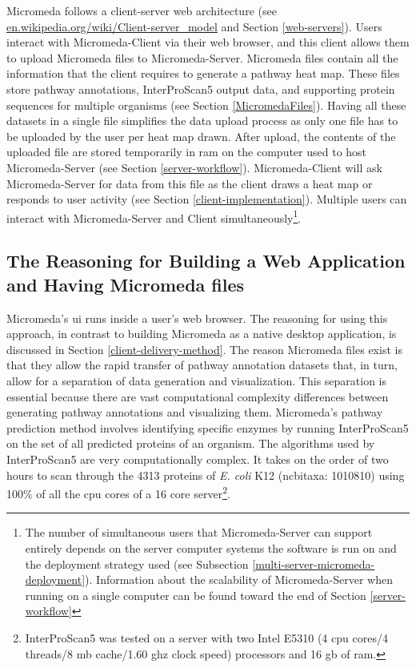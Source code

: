 Micromeda follows a client-server web architecture \cite{svobodova1985client} 
(see 
\href{http://en.wikipedia.org/wiki/Client-server_model}{en.wikipedia.org/wiki/Client-server\_model} 
and Section \ref{web-servers}). Users interact with Micromeda-Client via their 
web browser, and this client allows them to upload Micromeda files to 
Micromeda-Server. Micromeda files contain all the information that the client 
requires to generate a pathway heat map. These files store pathway annotations, 
InterProScan5 output data, and supporting protein sequences for multiple 
organisms (see Section \ref{MicromedaFiles}). Having all these datasets in a 
single file simplifies the data upload process as only one file has to be 
uploaded by the user per heat map drawn. After upload, the contents of the 
uploaded file are stored temporarily in \gls{ram} on the computer used to host 
Micromeda-Server (see Section \ref{server-workflow}). Micromeda-Client will ask 
Micromeda-Server for data from this file as the client draws a heat map or 
responds to user activity (see Section \ref{client-implementation}). Multiple 
users can interact with Micromeda-Server and Client simultaneously\footnote{The 
number of simultaneous users that Micromeda-Server can support entirely depends 
on the server computer systems the software is run on and the deployment 
strategy used (see Subsection \ref{multi-server-micromeda-deployment}). 
Information about the scalability of Micromeda-Server when running on a single 
computer can be found toward the end of Section \ref{server-workflow}}.

\subsection{The Reasoning for Building a Web Application and Having Micromeda 
files} \label{why-micromeda-files}

Micromeda's \gls{ui} runs inside a user's web browser. The reasoning for using 
this approach, in contrast to building Micromeda as a native desktop 
application, is discussed in Section \ref{client-delivery-method}. The reason 
Micromeda files exist is that they allow the rapid transfer of pathway 
annotation datasets that, in turn, allow for a separation of data generation and 
visualization. This separation is essential because there are vast computational 
complexity differences between generating pathway annotations and visualizing 
them. Micromeda's pathway prediction method involves identifying 
specific enzymes by running InterProScan5 on the set of all predicted proteins 
of an organism. The algorithms used by InterProScan5 are very computationally 
complex. It takes on the order of two hours to scan through the 4313 proteins of 
\textit{E. coli} K12 (\gls{ncbitaxa}: 1010810) using 100\% of all the \gls{cpu} 
cores of a 16 core server\footnote{InterProScan5 was tested on a server with two 
Intel E5310 (4 \gls{cpu} cores/4 threads/8 \gls{mb} cache/1.60 \gls{ghz} clock 
speed) processors and 16 \gls{gb}  of \gls{ram}.}.

